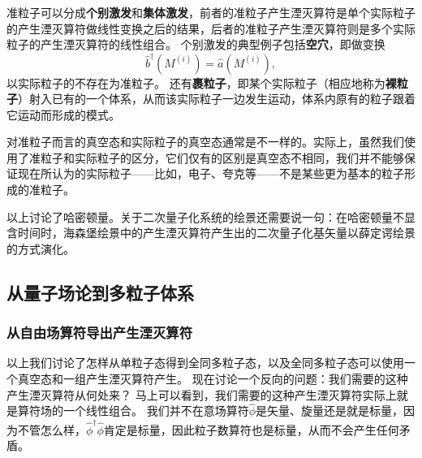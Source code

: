 \documentclass[hyperref, UTF8, a4paper]{ctexart}
\begin{document}
准粒子可以分成\textbf{个别激发}和\textbf{集体激发}，前者的准粒子产生湮灭算符是单个实际粒子的产生湮灭算符做线性变换之后的结果，后者的准粒子产生湮灭算符则是多个实际粒子的产生湮灭算符的线性组合。
个别激发的典型例子包括\textbf{空穴}，即做变换
\[
    \hat{b}^\dagger(M^{(i)}) = \hat{a}(M^{(i)}),
\]
以实际粒子的不存在为准粒子。
还有\textbf{裹粒子}，即某个实际粒子（相应地称为\textbf{裸粒子}）射入已有的一个体系，从而该实际粒子一边发生运动，体系内原有的粒子跟着它运动而形成的模式。

对准粒子而言的真空态和实际粒子的真空态通常是不一样的。实际上，虽然我们使用了准粒子和实际粒子的区分，它们仅有的区别是真空态不相同，我们并不能够保证现在所认为的实际粒子——比如，电子、夸克等——不是某些更为基本的粒子形成的准粒子。

以上讨论了哈密顿量。关于二次量子化系统的绘景还需要说一句：在哈密顿量不显含时间时，海森堡绘景中的产生湮灭算符产生出的二次量子化基矢量以薛定谔绘景的方式演化。

\subsection{从量子场论到多粒子体系}\label{sec:from-qft-to-many-body}

\subsubsection{从自由场算符导出产生湮灭算符}\label{sec:c-a-operator-from-field}

以上我们讨论了怎样从单粒子态得到全同多粒子态，以及全同多粒子态可以使用一个真空态和一组产生湮灭算符产生。
现在讨论一个反向的问题：我们需要的这种产生湮灭算符从何处来？
马上可以看到，我们需要的这种产生湮灭算符实际上就是算符场的一个线性组合。
我们并不在意场算符$\hat{\phi}$是矢量、旋量还是就是标量，因为不管怎么样，$\hat{\phi}^\dagger \hat{\phi}$肯定是标量，因此粒子数算符也是标量，从而不会产生任何矛盾。
\end{document}
